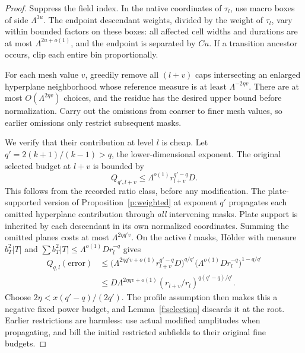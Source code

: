 \begin{proof}
Suppress the field index. In the native coordinates of $\tau_l$, use
macro boxes of side $\Lambda^{3u}$. The endpoint descendant weights,
divided by the weight of $\tau_l$, vary within bounded factors on
these boxes: all affected cell widths and durations are at most
$\Lambda^{2u+o(1)}$, and the endpoint is separated by $Cu$. If a
transition ancestor occurs, clip each entire bin proportionally.

For each mesh value $v$, greedily remove all $(l+v)$ caps intersecting
an enlarged hyperplane neighborhood whose reference measure is at
least $\Lambda^{-2\eta v}$. There are at most
$O(\Lambda^{2\eta v})$ choices, and the residue has the desired upper
bound before normalization. Carry out the omissions from coarser
to finer mesh values, so earlier omissions only restrict subsequent
masks.

We verify that their contribution at level $l$ is cheap. Let
$q'=2(k+1)/(k-1)>q$, the lower-dimensional exponent. The original
selected budget at $l+v$ is bounded by
\[
 Q_{q',l+v}\le\Lambda^{o(1)}r_{l+v}^{q'-q}D.
\]
This follows from the recorded ratio class, before any modification.
The plate-supported version of Proposition~\ref{p:weighted} at
exponent $q'$ propagates each omitted hyperplane contribution through
\emph{all} intervening masks. Plate support is inherited by each
descendant in its own normalized coordinates. Summing the omitted
planes costs at most $\Lambda^{2\eta q'v}$. On the active $l$ masks,
H\"older with measure $b_T^2|T|$ and
$\sum b_T^2|T|\le\Lambda^{o(1)}Dr_l^{-q}$ gives
\begin{align*}
 Q_{q,l}(\text{error})
 &\le \big(\Lambda^{2\eta q'v+o(1)}
                 r_{l+v}^{q'-q}D\big)^{q/q'}
          \big(\Lambda^{o(1)}Dr_l^{-q}\big)^{1-q/q'}\\
 &\le D\Lambda^{2\eta qv+o(1)}
       (r_{l+v}/r_l)^{q(q'-q)/q'}.
\end{align*}
Choose $2\eta<x(q'-q)/(2q')$. The profile assumption then makes this
a negative fixed power budget, and Lemma~\ref{f:selection} discards
it at the root. Earlier restrictions are harmless: use actual
modified amplitudes when propagating, and bill the initial
restricted subfields to their original fine budgets.


\end{proof}

